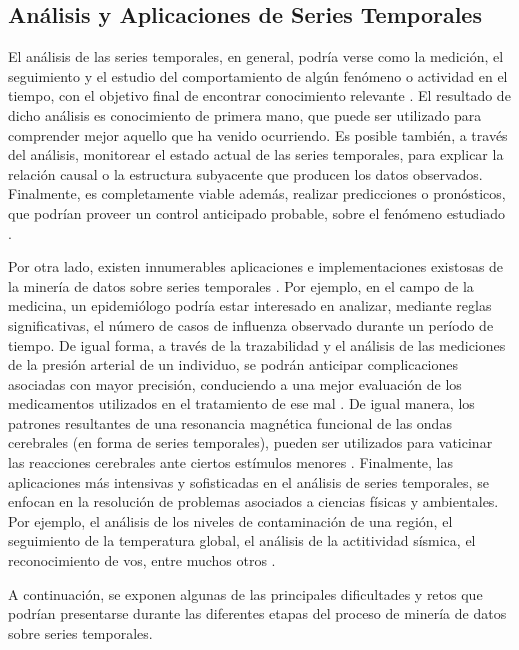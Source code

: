 \subsection{An\'alisis y Aplicaciones de Series Temporales}
El an\'alisis de las series temporales, en general, podr\'ia verse como la medici\'on, el seguimiento y el estudio del comportamiento de alg\'un fen\'omeno o  actividad en el tiempo, con el objetivo final de encontrar conocimiento relevante \cite{algoanalysis}. El resultado de dicho an\'alisis es conocimiento de primera mano, que puede ser utilizado para comprender mejor aquello que ha venido ocurriendo. Es posible tambi\'en, a trav\'es del an\'alisis, monitorear el estado actual de las series temporales, para explicar la relaci\'on causal o la estructura subyacente que producen los datos observados. Finalmente, es completamente viable adem\'as, realizar predicciones o pron\'osticos, que podr\'ian proveer un control anticipado probable, sobre el fen\'omeno estudiado \cite{main}.\par
Por otra lado, existen innumerables aplicaciones e implementaciones existosas de la miner\'ia de datos sobre series temporales \cite{concepts}. Por ejemplo, en el campo de la medicina, un epidemi\'ologo podr\'ia estar interesado en analizar, mediante reglas significativas, el n\'umero de casos de influenza observado durante un per\'iodo de tiempo. De igual forma, a trav\'es de la trazabilidad y el an\'alisis de las mediciones de la presi\'on arterial de un individuo, se podr\'an anticipar complicaciones asociadas con mayor precisi\'on, conduciendo a una mejor evalua\-ci\'on de los medicamentos utilizados en el tratamiento de ese mal \cite{timeseriesapplications}. De igual manera, los patrones resultantes de una resonancia magn\'etica funcional de las ondas cerebrales (en forma de series temporales), pueden ser utilizados para vaticinar las reacciones cerebrales ante ciertos est\'imulos menores \cite{timeseriesapplications}. Finalmente, las aplicaciones m\'as intensivas y sofisticadas en el an\'alisis de series temporales, se enfocan en la resoluci\'on de problemas asociados a ciencias f\'isicas y ambientales. Por ejemplo, el an\'alisis de los niveles de contaminaci\'on de una regi\'on, el seguimiento de la temperatura global, el an\'alisis de la actitividad s\'ismica, el reconocimiento de vos, entre muchos otros \cite{timeseriesapplications}.\par
A continuaci\'on, se exponen algunas de las principales dificultades y retos que podr\'ian presentarse durante las diferentes etapas del proceso de miner\'ia de datos sobre series temporales.
